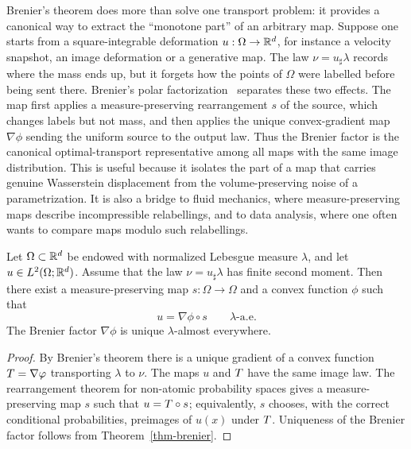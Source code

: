 Brenier's theorem does more than solve one transport problem: it provides a canonical way to extract the ``monotone part'' of an arbitrary map. Suppose one starts from a square-integrable deformation $u:\Omega\to\mathbb{R}^d$, for instance a velocity snapshot, an image deformation or a generative map. The law $\nu=u_\sharp\lambda$ records where the mass ends up, but it forgets how the points of $\Omega$ were labelled before being sent there. Brenier's polar factorization~\cite{MR923203,Brenier91} separates these two effects. The map first applies a measure-preserving rearrangement $s$ of the source, which changes labels but not mass, and then applies the unique convex-gradient map $\nabla\phi$ sending the uniform source to the output law. Thus the Brenier factor is the canonical optimal-transport representative among all maps with the same image distribution. This is useful because it isolates the part of a map that carries genuine Wasserstein displacement from the volume-preserving noise of a parametrization. It is also a bridge to fluid mechanics, where measure-preserving maps describe incompressible relabellings, and to data analysis, where one often wants to compare maps modulo such relabellings.

\begin{prop}\label{prop-polar-factorization}
	Let $\Omega\subset\mathbb{R}^d$ be endowed with normalized Lebesgue measure $\lambda$, and let $u\in L^2(\Omega;\mathbb{R}^d)$. Assume that the law $\nu=u_\sharp\lambda$ has finite second moment. Then there exist a measure-preserving map $s:\Omega\to\Omega$ and a convex function $\phi$ such that
	\[
		u=\nabla\phi\circ s
		\qquad \lambda\text{-a.e.}
	\]
	The Brenier factor $\nabla\phi$ is unique $\lambda$-almost everywhere.
\end{prop}
\begin{proof}
	By Brenier's theorem there is a unique gradient of a convex function $T=\nabla\varphi$ transporting $\lambda$ to $\nu$. The maps $u$ and $T$ have the same image law. The rearrangement theorem for non-atomic probability spaces gives a measure-preserving map $s$ such that $u=T\circ s$; equivalently, $s$ chooses, with the correct conditional probabilities, preimages of $u(x)$ under $T$. Uniqueness of the Brenier factor follows from Theorem~\ref{thm-brenier}.
\end{proof}


